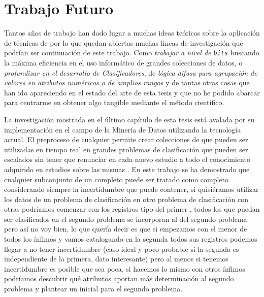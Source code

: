\section{Trabajo Futuro}
\label{sec:clasificacion:trabajo-futuro}
Tantos años de trabajo han dado lugar a muchas ideas teóricas sobre la aplicación de técnicas de \DM por lo que quedan abiertas muchas líneas de investigación que podrían ser continuación de este trabajo. Como \emph{trabajar a nivel de \texttt{bits}} buscando la máxima eficiencia en el uso informático de grandes colecciones de datos, o \emph{profundizar en el desarrollo de Clasificadores}, de \emph{lógica difusa para agrupación de valores en atributos numéricos o de amplios rangos} y de tantas otras cosas que han ido apareciendo en el estado del arte de esta tesis y que no he podido abarcar para centrarme en obtener algo tangible mediante el método científico.

La investigación mostrada en el último capítulo de esta tesis está avalada por su implementación en el campo de la Minería de Datos utilizando la tecnología actual.
El preproceso de cualquier \catalogo permite crear colecciones de \catalogos que pueden ser utilizadas en tiempo real en grandes problemas de clasificación que pueden ser escalados sin tener que renunciar en cada nuevo estudio a todo el conocimiento adquirido en estudios sobre las mismas \clases. En este trabajo se ha demostrado que cualquier subconjunto de un \catalogo completo puede ser tratado como \catalogo completo considerando siempre la incertidumbre que puede contener, si quisiéramos utilizar los datos de un problema de clasificación en otro problema de clasificación con otras \clases podríamos comenzar con los registros-tipo del primer \catalogo, todos los que puedan ser clasificados en el segundo problema se incorporan al \catalogo del segundo problema pero así no  voy bien, lo que quería decir es que si empezamos con el menor de todos los \catalogos ínfimos y vamos catalogando en la segunda \clase todos sus registros podemos llegar a no tener incertidumbre (caso ideal y poco probable si la segunda \clase es independiente de la primera, dato interesante) pero al menos si tenemos incertidumbre es posible que sea poca, si hacemos lo mismo con otros \catalogos ínfimos podríamos descubrir qué atributos aportan más determinación al segundo problema y plantear un \catalogo inicial para el segundo problema.

